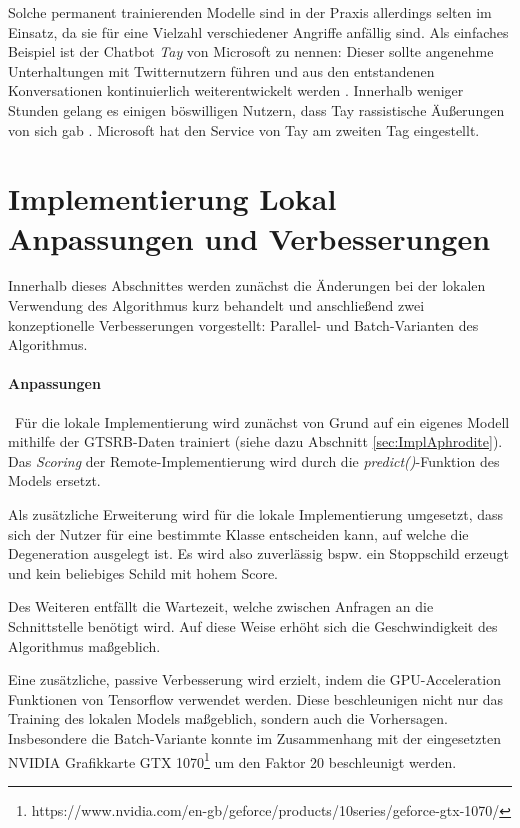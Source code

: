 Solche permanent trainierenden Modelle sind in der Praxis allerdings selten im Einsatz, da sie für eine Vielzahl verschiedener Angriffe anfällig sind. Als einfaches Beispiel ist der Chatbot \textit{Tay} von Microsoft zu nennen: Dieser sollte angenehme Unterhaltungen mit Twitternutzern führen und aus den entstandenen Konversationen kontinuierlich weiterentwickelt werden \cite{mstay}. Innerhalb weniger Stunden gelang es einigen böswilligen Nutzern, dass Tay rassistische Äußerungen von sich gab \cite{mstaydown}. Microsoft hat den Service von Tay am zweiten Tag eingestellt. 
\section[Implementierung Lokal]{Implementierung Lokal \newline Anpassungen und Verbesserungen}
\label{sec:DegenerationLokal}

Innerhalb dieses Abschnittes werden zunächst die Änderungen bei der lokalen Verwendung des Algorithmus kurz behandelt und anschließend zwei konzeptionelle Verbesserungen vorgestellt: Parallel- und Batch-Varianten des Algorithmus. 

\paragraph{Anpassungen} ~\newline Für die lokale Implementierung wird zunächst von Grund auf ein eigenes Modell mithilfe der \ac{GTSRB}-Daten trainiert (siehe dazu Abschnitt \ref{sec:ImplAphrodite}). Das \textit{Scoring} der Remote-Implementierung wird durch die \textit{predict()}-Funktion des Models ersetzt.

Als zusätzliche Erweiterung wird für die lokale Implementierung umgesetzt, dass sich der Nutzer für eine bestimmte Klasse entscheiden kann, auf welche die Degeneration ausgelegt ist. Es wird also zuverlässig bspw. ein Stoppschild erzeugt und kein beliebiges Schild mit hohem Score. 

Des Weiteren entfällt die Wartezeit, welche zwischen Anfragen an die Schnittstelle benötigt wird. Auf diese Weise erhöht sich die Geschwindigkeit des Algorithmus maßgeblich. 

Eine zusätzliche, passive Verbesserung wird erzielt, indem die GPU-Acceleration Funktionen von Tensorflow verwendet werden. Diese beschleunigen nicht nur das Training des lokalen Models maßgeblich, sondern auch die Vorhersagen. Insbesondere die Batch-Variante konnte im Zusammenhang mit der eingesetzten NVIDIA Grafikkarte GTX 1070\footnote{https://www.nvidia.com/en-gb/geforce/products/10series/geforce-gtx-1070/} um den Faktor 20 beschleunigt werden.


